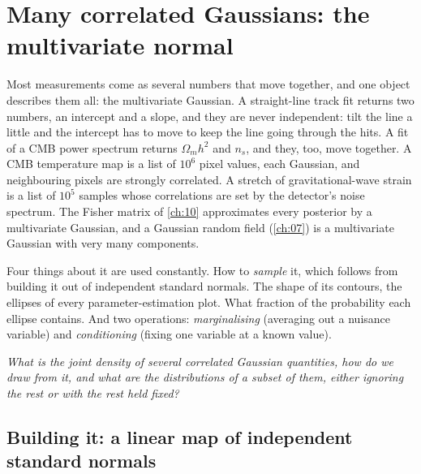 \section{Many correlated Gaussians: the multivariate normal}
\label{2b:sec:mvn}

Most measurements come as several numbers that move together, and one object describes them all: the multivariate Gaussian. A straight-line track fit returns two numbers, an intercept and a slope, and they are never independent: tilt the line a little and the intercept has to move to keep the line going through the hits. A fit of a CMB power spectrum returns $\Omega_m h^2$ and $n_s$, and they, too, move together. A CMB temperature map is a list of $10^6$ pixel values, each Gaussian, and neighbouring pixels are strongly correlated. A stretch of gravitational-wave strain is a list of $10^5$ samples whose correlations are set by the detector's noise spectrum. The Fisher matrix of \cref{ch:10} approximates every posterior by a multivariate Gaussian, and a Gaussian random field (\cref{ch:07}) is a multivariate Gaussian with very many components.

Four things about it are used constantly. How to \emph{sample} it, which follows from building it out of independent standard normals. The shape of its contours, the ellipses of every parameter-estimation plot. What fraction of the probability each ellipse contains. And two operations: \emph{marginalising} (averaging out a nuisance variable) and \emph{conditioning} (fixing one variable at a known value).

\emph{What is the joint density of several correlated Gaussian quantities, how do we draw from it, and what are the distributions of a subset of them, either ignoring the rest or with the rest held fixed?}

\subsection{Building it: a linear map of independent standard normals}
\label{2b:sec:mvn-build}

